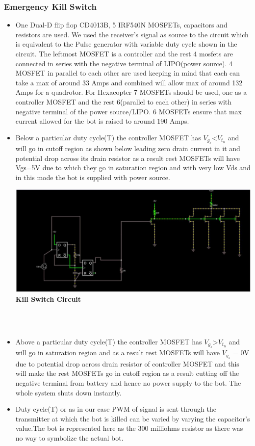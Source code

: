 \documentclass[12pt]{article}
\begin{document}
	\subsubsection{Emergency Kill Switch}
\begin{itemize}
\item One Dual-D flip flop CD4013B, 5 IRF540N MOSFETs, capacitors and resistors are used. We used the receiver’s signal as source to the circuit which is equivalent to the Pulse generator with variable duty cycle shown in the circuit. The leftmost MOSFET is a controller and the rest 4  mosfets  are connected in series with the negative terminal of LIPO(power source). 4 MOSFET in parallel to each other are used  keeping in mind that each can take a max of around 33 Amps and combined will allow max of around 132 Amps for a quadrotor. For Hexacopter 7 MOSFETs should be used, one as a controller MOSFET and the rest 6(parallel to each other) in series with negative terminal of the power source/LIPO. 6 MOSFETs ensure that max current allowed for the bot is raised to around 190 Amps.  
\item Below a particular duty cycle(T) the controller MOSFET has $V_g_s$<$V_t_h$ and will go in cutoff region as shown below leading zero drain current in it and potential drop across its drain resistor as a result rest MOSFETs will have Vgs=5V due to which they go in saturation region and with very low Vds and in this mode the bot is supplied with power source.\\
\begin{center}
\includegraphics[scale = 0.4]{kill} \\
\textbf{Kill Switch Circuit}\\ \\
\end{center}
\\
\item Above a particular duty cycle(T) the controller MOSFET has $V_g_s$>$V_t_h$ and will go in saturation region and as a result rest MOSFETs will have $V_g_s$ = 0V due to potential drop across drain resistor of controller MOSFET and this will make the rest MOSFETs go in cutoff region as a result cutting off the negative terminal from battery and hence no power supply to the bot. The whole system shuts down instantly.
\item Duty cycle(T) or as in our case PWM of signal  is sent through the transmitter at which the bot is killed can be varied by varying the capacitor’s value.The bot is represented here as the 300 milliohms resistor as there was no way to symbolize the actual bot.
\end{itemize}
\end{document}

